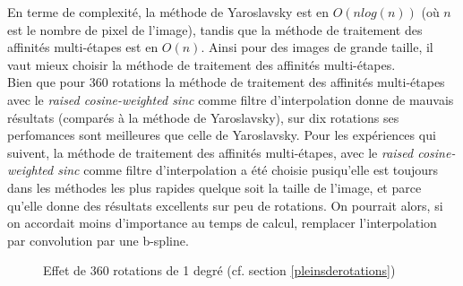 En terme de complexité, la méthode de Yaroslavsky est en $O(n log(n))$ (où $n$ est le nombre de pixel de l'image), tandis que la méthode de traitement des affinités multi-étapes est en $O(n)$. Ainsi pour des images de grande taille, il vaut mieux choisir la méthode de traitement des affinités multi-étapes.\\

Bien que pour 360 rotations la méthode de traitement des affinités multi-étapes avec le \emph{raised cosine-weighted sinc} comme filtre d'interpolation donne de mauvais résultats (comparés à la méthode de Yaroslavsky), sur dix rotations ses perfomances sont meilleures que celle de Yaroslavsky.
Pour les expériences qui suivent, la méthode de traitement des affinités multi-étapes, avec le \emph{raised cosine-weighted sinc} comme filtre d'interpolation a été choisie pusiqu'elle est toujours dans les méthodes les plus rapides quelque soit la taille de l'image, et parce qu'elle donne des résultats excellents sur peu de rotations. 
On pourrait alors, si on accordait moins d'importance au temps de calcul, remplacer l'interpolation par convolution par une b-spline.

 \begin{figure}[h]
 \centering
  
\caption{Effet de 360 rotations de 1 degré (cf. section \ref{pleinsderotations})}
\label{troiscentrotations}
 \end{figure}

